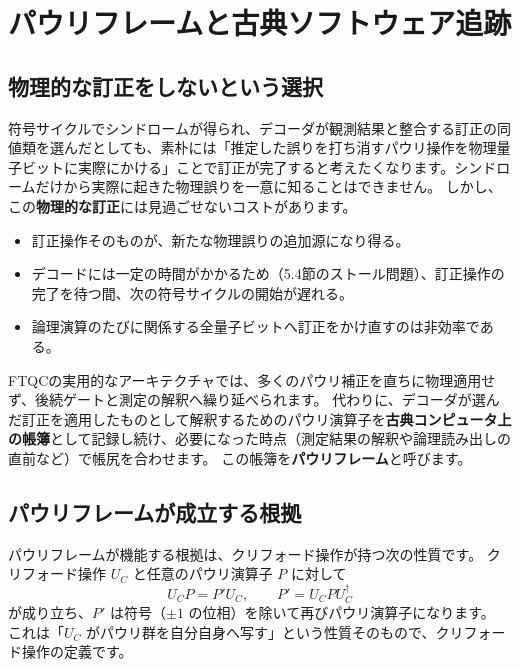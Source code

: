 \section{パウリフレームと古典ソフトウェア追跡}\label{sec:pauli_frame}

\subsection{物理的な訂正をしないという選択}

符号サイクルでシンドロームが得られ、デコーダが観測結果と整合する訂正の同値類を選んだとしても、素朴には「推定した誤りを打ち消すパウリ操作を物理量子ビットに実際にかける」ことで訂正が完了すると考えたくなります。シンドロームだけから実際に起きた物理誤りを一意に知ることはできません。
しかし、この\textbf{物理的な訂正}には見過ごせないコストがあります。

\begin{itemize}
  \item 訂正操作そのものが、新たな物理誤りの追加源になり得る。
  \item デコードには一定の時間がかかるため（5.4節のストール問題）、訂正操作の完了を待つ間、次の符号サイクルの開始が遅れる。
  \item 論理演算のたびに関係する全量子ビットへ訂正をかけ直すのは非効率である。
\end{itemize}

FTQCの実用的なアーキテクチャでは、多くのパウリ補正を直ちに物理適用せず、後続ゲートと測定の解釈へ繰り延べられます。
代わりに、デコーダが選んだ訂正を適用したものとして解釈するためのパウリ演算子を\textbf{古典コンピュータ上の帳簿}として記録し続け、必要になった時点（測定結果の解釈や論理読み出しの直前など）で帳尻を合わせます。
この帳簿を\textbf{パウリフレーム}と呼びます。

\subsection{パウリフレームが成立する根拠}

パウリフレームが機能する根拠は、クリフォード操作が持つ次の性質です。
クリフォード操作 $U_C$ と任意のパウリ演算子 $P$ に対して
\begin{equation}\label{eq:clifford_conj}
  U_C P = P' U_C, \qquad P' = U_C P U_C^\dagger
\end{equation}
が成り立ち、$P'$ は符号（$\pm1$ の位相）を除いて再びパウリ演算子になります。
これは「$U_C$ がパウリ群を自分自身へ写す」という性質そのもので、クリフォード操作の定義です\cite{aaronson2004stabilizer}。

